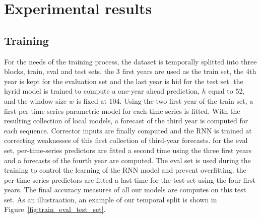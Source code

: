 \documentclass{article} %
\newcommand{\lag}{h}
\newcommand{\window}{w}
\begin{document}
\section{Experimental results}
\label{sec:exp}

\subsection{Training}

For the needs of the training process, the dataset is temporally splitted into three blocks, train, eval and test sets. the 3 first years are used as the train set, the 4th year is kept for the evaluation set and the last year is hid for the test set. the hyrid model is trained to compute a one-year ahead prediction, $\lag$ equal to 52, and the window size $\window$ is fixed at 104.
Using the two first year of the train set, a first per-time-series parametric model for each time series is fitted. With the resulting collection of local models, a forecast of the third year is computed for each sequence. Corrector inputs are finally computed and the RNN is trained at correcting weaknesses of this first collection of third-year forecasts. for the eval set, per-time-series predictors are fitted a second time using the three first years and a forecasts of the fourth year are computed. The eval set is used during the training to control the learning of the RNN model and prevent overfitting. the per-time-series predictors are fitted a last time for the test set using the four first years. The final accuracy measures of all our models are computes on this test set. As an illustraation, an example of our temporal split is shown in Figure~\ref{fig:train_eval_test_set}.

\end{document}
